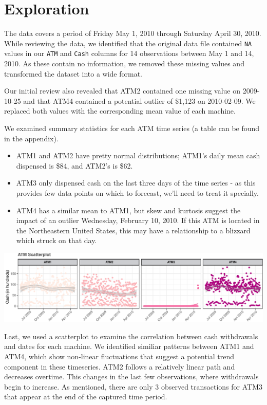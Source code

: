 \documentclass[openany]{book}
\providecommand{\tightlist}{%
  \setlength{\itemsep}{0pt}\setlength{\parskip}{0pt}}
\begin{document}
\hypertarget{exploration}{%
\section{Exploration}\label{exploration}}

The data covers a period of Friday May 1, 2010 through Saturday April
30, 2010. While reviewing the data, we identified that the original data
file contained \texttt{NA} values in our \texttt{ATM} and \texttt{Cash}
columns for 14 observations between May 1 and 14, 2010. As these contain
no information, we removed these missing values and transformed the
dataset into a wide format.

Our initial review also revealed that ATM2 contained one missing value
on 2009-10-25 and that ATM4 contained a potential outlier of \$1,123 on
2010-02-09. We replaced both values with the corresponding mean value of
each machine.

We examined summary statistics for each ATM time series (a table can be
found in the appendix).

\begin{itemize}
\tightlist
\item
  ATM1 and ATM2 have pretty normal distributions; ATM1's daily mean cash
  dispensed is \$84, and ATM2's is \$62.
\item
  ATM3 only dispensed cash on the last three days of the time series -
  as this provides few data points on which to forecast, we'll need to
  treat it specially.
\item
  ATM4 has a similar mean to ATM1, but skew and kurtosis suggest the
  impact of an outlier Wednesday, February 10, 2010. If this ATM is
  located in the Northeastern United States, this may have a
  relationship to a blizzard which struck on that day.
\end{itemize}

\includegraphics{Group2_Project1_Fall2019_files/figure-latex/unnamed-chunk-2-1.pdf}

Last, we used a scatterplot to examine the correlation between cash
withdrawals and dates for each machine. We identified similiar patterns
between ATM1 and ATM4, which show non-linear fluctuations that suggest a
potential trend component in these timeseries. ATM2 follows a relatively
linear path and decreases overtime. This changes in the last few
observations, where withdrawals begin to increase. As mentioned, there
are only 3 observed transactions for ATM3 that appear at the end of the
captured time period.
\end{document}
